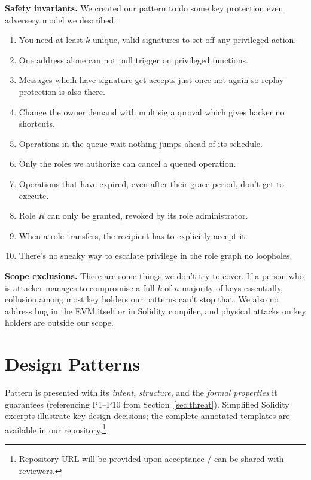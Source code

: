 \documentclass[conference]{IEEEtran}
\begin{document}
\textbf{Safety invariants.}  We created our pattern to do some
key protection even adversery model we described.
\begin{enumerate}
  \item[\textbf{P1}] You need at least $k$ unique, valid signatures to
        set off any privileged action.
  \item[\textbf{P2}] One address alone can not pull trigger on
        privileged functions.
  \item[\textbf{P3}] Messages whcih have signature get accepts just
        once not again so replay protection is also there.
  \item[\textbf{P4}] Change the owner demand with multisig
        approval which gives hacker no shortcuts.
  \item[\textbf{P5}] Operations in the queue wait nothing jumps
        ahead of its schedule.
  \item[\textbf{P6}] Only the roles we authorize can cancel a queued
        operation.
  \item[\textbf{P7}] Operations that have expired, even after their
        grace period, don't get to execute.
  \item[\textbf{P8}] Role $R$ can only be granted, revoked by its
        role administrator.
  \item[\textbf{P9}] When a role transfers, the recipient has to
        explicitly accept it.
  \item[\textbf{P10}] There's no sneaky way to escalate privilege in
        the role graph no loopholes.
\end{enumerate}

\textbf{Scope exclusions.}  There are some things we don't try to
cover.  If a person who is attacker manages to compromise a full $k$-of-$n$
majority of keys essentially, collusion among most key
holders our patterns can't stop that.  We also no address bug in
the EVM itself or in Solidity compiler, and physical attacks on
key holders are outside our scope.

\section{Design Patterns}
\label{sec:patterns}

Pattern is presented with its \emph{intent}, \emph{structure},
and the \emph{formal properties} it guarantees (referencing
P1--P10 from Section~\ref{sec:threat}).  Simplified Solidity
excerpts illustrate key design decisions; the complete annotated
templates are available in our repository.\footnote{Repository URL
will be provided upon acceptance / can be shared with reviewers.}
\end{document}
